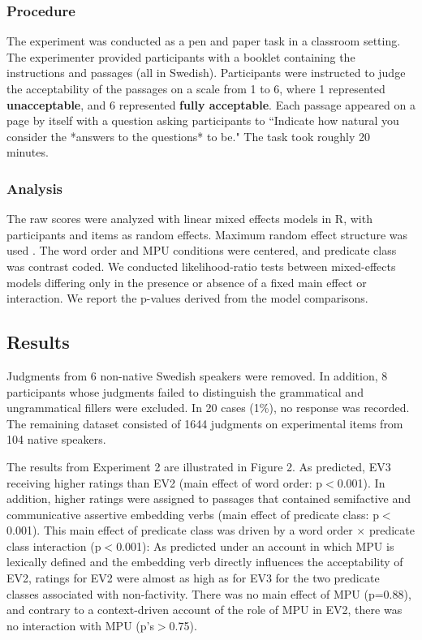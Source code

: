 \documentclass[output=paper]{LSP/langsci}
\begin{document}
\subsubsection*{Procedure}

The experiment was conducted as a pen and paper task in a classroom setting.
The experimenter provided participants with a booklet containing the
instructions and passages (all in Swedish).  Participants were instructed to
judge the acceptability of the passages on a scale from 1 to 6, where 1
represented \textbf{unacceptable}, and 6 represented \textbf{fully acceptable}.
Each passage appeared on a page by itself with a question asking participants to ``Indicate how natural you consider the *answers to the questions* to be."  The task took roughly 20 minutes.

\subsubsection*{Analysis}


The raw scores were analyzed with linear mixed effects models in R, with
participants and items as random effects.  Maximum random effect structure was
used \citep{barr-etal13}.  The word order and MPU conditions were centered, and 
predicate class was contrast coded.  We conducted likelihood-ratio tests
between mixed-effects models differing only in the presence or absence of a
fixed main effect or interaction.  We report the p-values derived from the model
comparisons.

\subsection{Results}

Judgments from 6 non-native Swedish speakers were removed.  In addition, 8 participants whose judgments failed to distinguish the grammatical and ungrammatical fillers were excluded.  In 20 cases (1\%), no response was recorded. The remaining dataset consisted of 1644 judgments on experimental items from 104 native speakers.

The results from Experiment 2 are illustrated in Figure 2.  As predicted, EV3 receiving higher ratings than EV2 (main effect of word order:  p$<$0.001).  In addition, higher ratings were assigned to passages that contained semifactive and communicative assertive embedding verbs (main effect of predicate class: p$<$0.001). This main effect of predicate class was driven by a word order $\times$ predicate class interaction (p$<$0.001): As predicted under an account in which MPU is lexically defined and the embedding verb directly influences the acceptability of EV2, ratings for EV2 were almost as high as for EV3 for the two predicate classes associated with non-factivity.  There was no main effect of MPU (p=0.88), and contrary to a context-driven account of the role of MPU in EV2, there was no interaction with MPU (p's$>$0.75).
\end{document}
